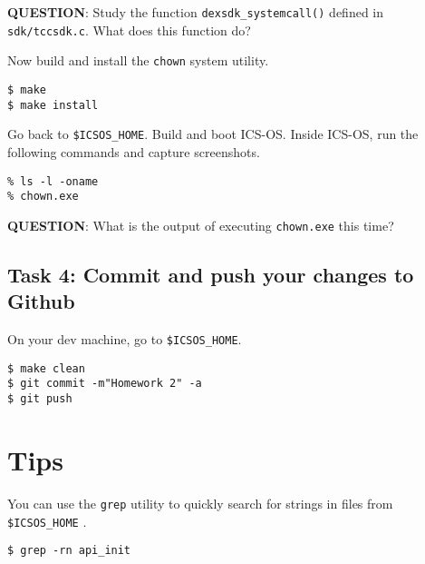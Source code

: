 \documentclass[a4paper, 11pt,oneside]{article}
\begin{document}
\textbf{QUESTION}: Study the function \texttt{dexsdk\_systemcall()} defined in \texttt{sdk/tccsdk.c}.
What does this function do?

Now build and install the \texttt{chown} system utility.
\begin{Verbatim}[frame=single]
$ make
$ make install
\end{Verbatim}

Go back to \texttt{\$ICSOS\_HOME}. Build and boot ICS-OS. 
Inside ICS-OS, run the following commands and capture screenshots.

\begin{Verbatim}[frame=single]
% cd apps
% ls -l -oname
% chown.exe
\end{Verbatim}

\textbf{QUESTION}: What is the output of executing \texttt{chown.exe} this time?

\subsection*{Task 4: Commit and push your changes to Github}
On your dev machine, go to \texttt{\$ICSOS\_HOME}.
\begin{Verbatim}[frame=single]
$ make clean
$ git commit -m"Homework 2" -a
$ git push
\end{Verbatim}


\section{Tips}
You can use the \texttt{grep} utility to quickly search for strings in files from \texttt{\$ICSOS\_HOME} .
\begin{Verbatim}[frame=single]
$ grep -rn api_init
\end{Verbatim}
 
\end{document}
